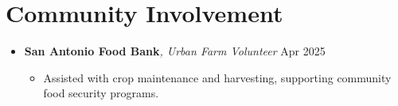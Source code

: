 \documentclass[letterpaper,10pt]{article}
\newcommand{\resumeItem}[1]{\item \small{#1}}
\begin{document}
\section*{Community Involvement}
\begin{itemize}
  \item[] 
  \textbf{San Antonio Food Bank}\textit{, Urban Farm Volunteer} \hfill Apr 2025
  \begin{itemize}[leftmargin=0.15in]
    \resumeItem{Assisted with crop maintenance and harvesting, supporting community food security programs.}
  \end{itemize}
\end{itemize}
\end{document}
